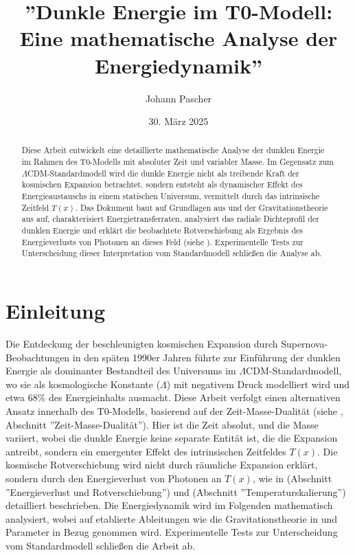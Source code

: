 \documentclass[a4paper,12pt]{article}
\theoremstyle{definition}
\theoremstyle{remark}
\newcommand{\Tfield}{T(x)}
\begin{document}
	
	\title{''Dunkle Energie im T0-Modell: \\Eine mathematische Analyse der Energiedynamik''}
	\author{Johann Pascher}
	\date{30. März 2025}
	\maketitle
	
	\begin{abstract}
		Diese Arbeit entwickelt eine detaillierte mathematische Analyse der dunklen Energie im Rahmen des T0-Modells mit absoluter Zeit und variabler Masse. Im Gegensatz zum \(\Lambda\)CDM-Standardmodell wird die dunkle Energie nicht als treibende Kraft der kosmischen Expansion betrachtet, sondern entsteht als dynamischer Effekt des Energieaustauschs in einem statischen Universum, vermittelt durch das intrinsische Zeitfeld \(\Tfield\). Das Dokument baut auf Grundlagen aus \cite{pascher_params_2025} und der Gravitationstheorie aus \cite{pascher_galaxies_2025} auf, charakterisiert Energietransferraten, analysiert das radiale Dichteprofil der dunklen Energie und erklärt die beobachtete Rotverschiebung als Ergebnis des Energieverlusts von Photonen an dieses Feld (siehe \cite{pascher_messdifferenzen_2025}). Experimentelle Tests zur Unterscheidung dieser Interpretation vom Standardmodell schließen die Analyse ab.
	\end{abstract}
	
	\tableofcontents
	\newpage
	
	\section{Einleitung}
	
	Die Entdeckung der beschleunigten kosmischen Expansion durch Supernova-Beobachtungen in den späten 1990er Jahren führte zur Einführung der dunklen Energie als dominanter Bestandteil des Universums im \(\Lambda\)CDM-Standardmodell, wo sie als kosmologische Konstante (\(\Lambda\)) mit negativem Druck modelliert wird und etwa 68\% des Energieinhalts ausmacht. Diese Arbeit verfolgt einen alternativen Ansatz innerhalb des T0-Modells, basierend auf der Zeit-Masse-Dualität (siehe \cite{pascher_params_2025}, Abschnitt ''Zeit-Masse-Dualität''). Hier ist die Zeit absolut, und die Masse variiert, wobei die dunkle Energie keine separate Entität ist, die die Expansion antreibt, sondern ein emergenter Effekt des intrinsischen Zeitfeldes \(\Tfield\). Die kosmische Rotverschiebung wird nicht durch räumliche Expansion erklärt, sondern durch den Energieverlust von Photonen an \(\Tfield\), wie in \cite{pascher_messdifferenzen_2025} (Abschnitt ''Energieverlust und Rotverschiebung'') und \cite{pascher_temp_2025} (Abschnitt ''Temperaturskalierung'') detailliert beschrieben. Die Energiedynamik wird im Folgenden mathematisch analysiert, wobei auf etablierte Ableitungen wie die Gravitationstheorie in \cite{pascher_galaxies_2025} und Parameter in \cite{pascher_params_2025} Bezug genommen wird. Experimentelle Tests zur Unterscheidung vom Standardmodell schließen die Arbeit ab.
	
\end{document}
